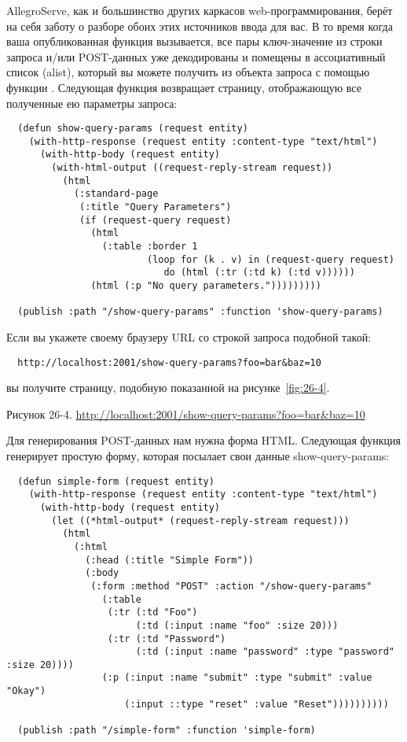 AllegroServe, как и большинство других каркасов web-программирования, берёт на себя заботу
о разборе обоих этих источников ввода для вас. В то время когда ваша опубликованная
функция вызывается, все пары ключ-значение из строки запроса и/или POST-данных уже
декодированы и помещены в ассоциативный список (alist), который вы можете получить из
объекта запроса с помощью функции . Следующая функция возвращает
страницу, отображающую все полученные ею параметры запроса:

\begin{lstlisting}
  (defun show-query-params (request entity)
    (with-http-response (request entity :content-type "text/html")
      (with-http-body (request entity)
        (with-html-output ((request-reply-stream request))
          (html
            (:standard-page
             (:title "Query Parameters")
             (if (request-query request)
               (html 
                 (:table :border 1
                         (loop for (k . v) in (request-query request)
                            do (html (:tr (:td k) (:td v))))))
               (html (:p "No query parameters.")))))))))

  (publish :path "/show-query-params" :function 'show-query-params)
\end{lstlisting}

Если вы укажете своему браузеру URL со строкой запроса подобной такой:

\begin{verbatim}
  http://localhost:2001/show-query-params?foo=bar&baz=10
\end{verbatim}

вы получите страницу, подобную показанной на рисунке~\ref{fig:26-4}.

Рисунок 26-4. \url{http://localhost:2001/show-query-params?foo=bar&baz=10}

Для генерирования POST-данных нам нужна форма HTML. Следующая функция генерирует простую
форму, которая посылает свои данные show-query-params:

\begin{lstlisting}
  (defun simple-form (request entity)
    (with-http-response (request entity :content-type "text/html")
      (with-http-body (request entity)
        (let ((*html-output* (request-reply-stream request)))
          (html
            (:html
              (:head (:title "Simple Form"))
              (:body
               (:form :method "POST" :action "/show-query-params"
                 (:table
                  (:tr (:td "Foo")
                       (:td (:input :name "foo" :size 20)))
                  (:tr (:td "Password")
                       (:td (:input :name "password" :type "password" :size 20))))
                 (:p (:input :name "submit" :type "submit" :value "Okay")
                     (:input ::type "reset" :value "Reset"))))))))))

  (publish :path "/simple-form" :function 'simple-form)
\end{lstlisting}

